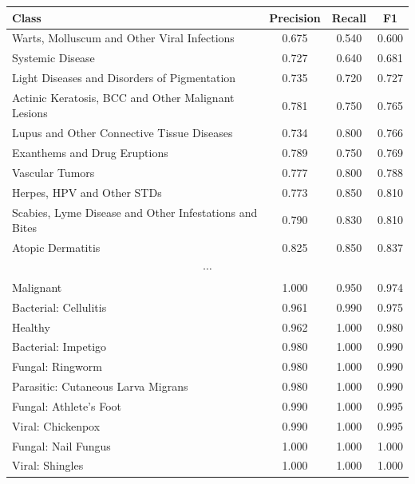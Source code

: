 \begin{tabular}{p{9cm}ccc}
  \hline
  Class & Precision & Recall & F1 \\ \hline
  Warts, Molluscum and Other Viral Infections & 0.675 & 0.540 & 0.600 \\
  Systemic Disease & 0.727 & 0.640 & 0.681 \\
  Light Diseases and Disorders of Pigmentation & 0.735 & 0.720 & 0.727 \\
  Actinic Keratosis, BCC and Other Malignant Lesions & 0.781 & 0.750 & 0.765 \\
  Lupus and Other Connective Tissue Diseases & 0.734 & 0.800 & 0.766 \\
  Exanthems and Drug Eruptions & 0.789 & 0.750 & 0.769 \\
  Vascular Tumors & 0.777 & 0.800 & 0.788 \\
  Herpes, HPV and Other STDs & 0.773 & 0.850 & 0.810 \\
  Scabies, Lyme Disease and Other Infestations and Bites & 0.790 & 0.830 & 0.810 \\
  Atopic Dermatitis & 0.825 & 0.850 & 0.837 \\
  \multicolumn{4}{c}{$\cdots$} \\
  Malignant & 1.000 & 0.950 & 0.974 \\
  Bacterial: Cellulitis & 0.961 & 0.990 & 0.975 \\
  Healthy & 0.962 & 1.000 & 0.980 \\
  Bacterial: Impetigo & 0.980 & 1.000 & 0.990 \\
  Fungal: Ringworm & 0.980 & 1.000 & 0.990 \\
  Parasitic: Cutaneous Larva Migrans & 0.980 & 1.000 & 0.990 \\
  Fungal: Athlete's Foot & 0.990 & 1.000 & 0.995 \\
  Viral: Chickenpox & 0.990 & 1.000 & 0.995 \\
  Fungal: Nail Fungus & 1.000 & 1.000 & 1.000 \\
  Viral: Shingles & 1.000 & 1.000 & 1.000 \\
  \hline
\end{tabular}